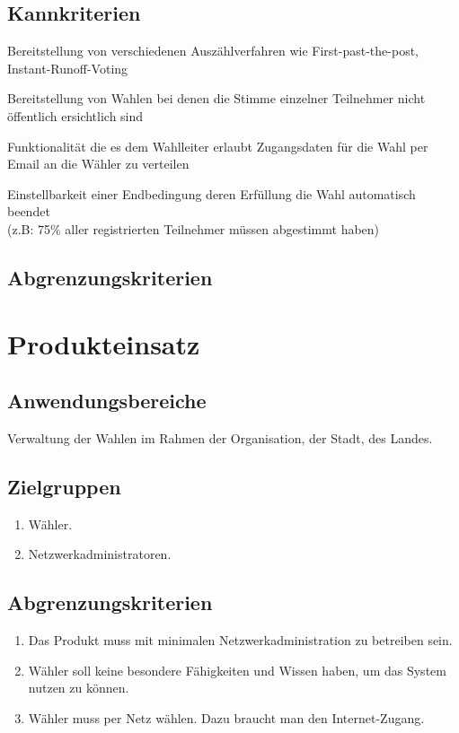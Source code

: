\documentclass[parskip=full,11pt,twoside]{scrartcl}
\begin{document}
\subsection{Kannkriterien}

Bereitstellung von verschiedenen Auszählverfahren wie First-past-the-post, Instant-Runoff-Voting

Bereitstellung von Wahlen bei denen die Stimme einzelner Teilnehmer nicht öffentlich ersichtlich sind

Funktionalität die es dem Wahlleiter erlaubt Zugangsdaten für die Wahl per Email an die Wähler zu verteilen

Einstellbarkeit einer Endbedingung deren Erfüllung die Wahl automatisch beendet \\(z.B: 75\% aller registrierten Teilnehmer müssen abgestimmt haben)

\subsection{Abgrenzungskriterien}

\section{Produkteinsatz}

\subsection{Anwendungsbereiche}
Verwaltung der Wahlen im Rahmen der Organisation, der Stadt, des Landes.

\subsection{Zielgruppen}
\begin{enumerate}
  \item Wähler.
  \item Netzwerkadministratoren.
\end{enumerate}

\subsection{Abgrenzungskriterien}
\begin{enumerate}
  \item Das Produkt muss mit minimalen Netzwerkadministration zu betreiben sein.
  \item Wähler soll keine besondere Fähigkeiten und Wissen  haben, um das System nutzen zu können.
  \item Wähler muss per Netz wählen. Dazu braucht man den Internet-Zugang.
\end{enumerate}
\end{document}

